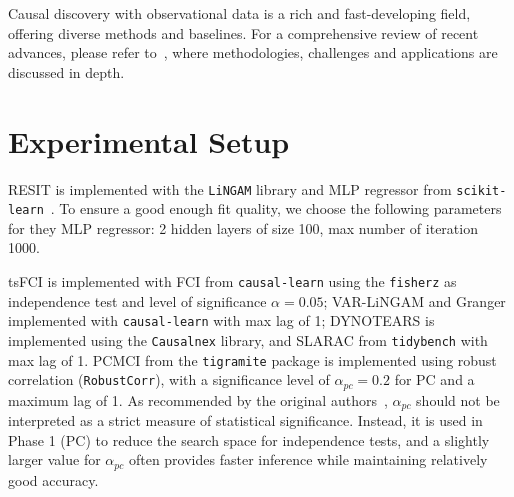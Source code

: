 
Causal discovery with observational data is a rich and fast-developing field, offering diverse methods and baselines. For a comprehensive review of recent advances, please refer to~\citep{camps2023discovering}, where methodologies, challenges and applications are discussed in depth.


\section{Experimental Setup}
\label{appsec:exp_setup}

RESIT is implemented with the \texttt{LiNGAM} library and MLP regressor from \texttt{scikit-learn}~\citep{scikit-learn, sklearn_api}. To ensure a good enough fit quality, we choose the following parameters for they MLP regressor: 2 hidden layers of size 100, max number of iteration 1000.

tsFCI is implemented with FCI from \texttt{causal-learn} using the \texttt{fisherz} as independence test and level of significance $\alpha=0.05$; VAR-LiNGAM and Granger implemented with \texttt{causal-learn} with max lag of 1; DYNOTEARS is implemented using the \texttt{Causalnex} library, and SLARAC from \texttt{tidybench} with max lag of 1. PCMCI from the \texttt{tigramite} package is implemented using robust correlation (\texttt{RobustCorr}), with a significance level of $\alpha_{pc}=0.2$ for PC and a maximum lag of 1. As recommended by the original authors~\citep{runge2019detecting}, $\alpha_{pc}$ should not be interpreted as a strict measure of statistical significance. Instead, it is used in Phase 1 (PC) to reduce the search space for independence tests, and a slightly larger value for $\alpha_{pc}$ often provides faster inference while maintaining relatively good accuracy. 




